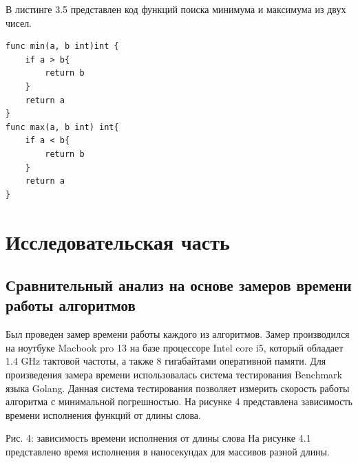 \documentclass[12pt]{report}
\begin{document}
В листинге 3.5 представлен код функций поиска минимума и максимума из двух чисел.
\begin{lstlisting}[label=some-code, caption=Функции поиска минимума и максимума]
func min(a, b int)int {
	if a > b{
		return b
	}
	return a
}
func max(a, b int) int{
	if a < b{
		return b
	}
	return a
}
\end{lstlisting}

\chapter{Исследовательская часть}

\section{Сравнительный анализ на основе замеров времени работы алгоритмов}

Был проведен замер времени работы каждого из алгоритмов. Замер производился на ноутбуке Macbook pro 13 на базе процессоре Intel core i5, который обладает  1.4 GHz тактовой частоты, а также 8 гигабайтами оперативной памяти.\cite{computer}\cite{intel} Для произведения замера времени использовалась система тестирования Benchmark языка Golang.
Данная система тестирования позволяет измерить скорость работы алгоритма с минимальной погрешностью. \newline
На рисунке 4 представлена зависимость времени исполнения функций от длины слова.\newline
{} \newline
Рис. 4: зависимость времени исполнения от длины слова
\newline
На рисунке 4.1 представлено время исполнения в наносекундах для массивов разной длины.
\end{document}
